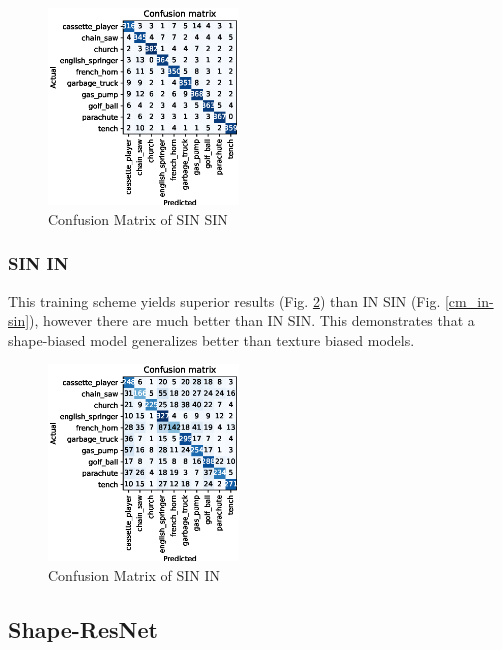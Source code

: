 \documentclass{article}
\begin{document}
\begin{figure}[h!]
  \includegraphics[width = 0.45\textwidth]{imgs/sin/sin-sin/sin-sin_confusion_matrix_0.908.eps}
  \caption{Confusion Matrix of SIN \texorpdfstring{\textrightarrow} .SIN}
  \label{cm_sin-sin}
\end{figure}

\subsubsection{SIN \texorpdfstring{\textrightarrow} .IN}

This training scheme yields superior results (Fig. \ref{cm_sin-in}) than IN \texorpdfstring{\textrightarrow} .SIN (Fig. \ref{cm_in-sin}), however
there are much better than IN \texorpdfstring{\textrightarrow} .SIN.
This demonstrates that a shape-biased model generalizes better than texture biased models.

\begin{figure}[h!]
  \includegraphics[width = 0.45\textwidth]{imgs/sin/sin-in/sin-in_confusion_matrix_0.624.eps}
  \caption{Confusion Matrix of SIN \texorpdfstring{\textrightarrow} .IN}
  \label{cm_sin-in}
\end{figure}

\subsection{Shape-ResNet}
\end{document}
